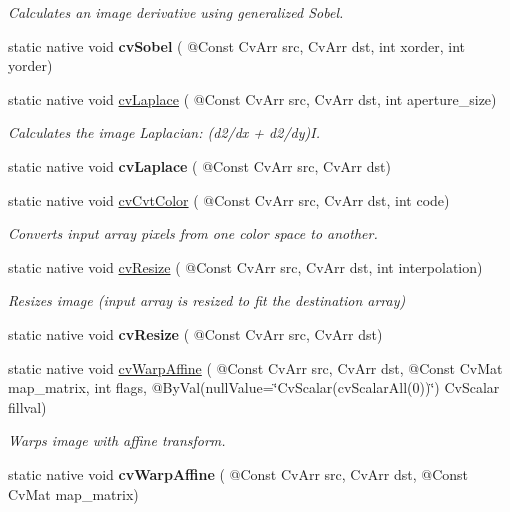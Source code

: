 \begin{DoxyCompactItemize}
\begin{DoxyCompactList}\small\item\em Calculates an image derivative using generalized Sobel. \end{DoxyCompactList}\item 
static native void {\bfseries cv\+Sobel} ( @Const Cv\+Arr src, Cv\+Arr dst, int xorder, int yorder)
\item 
static native void \hyperlink{group__imgproc__c_ga4b503d9c276d19dbced13ecd77b845a2}{cv\+Laplace} ( @Const Cv\+Arr src, Cv\+Arr dst, int aperture\+\_\+size)
\begin{DoxyCompactList}\small\item\em Calculates the image Laplacian\+: (d2/dx + d2/dy)I. \end{DoxyCompactList}\item 
static native void {\bfseries cv\+Laplace} ( @Const Cv\+Arr src, Cv\+Arr dst)
\item 
static native void \hyperlink{group__imgproc__c_gae45ba0b6ff1ccbe51ca42d2c6d6373bb}{cv\+Cvt\+Color} ( @Const Cv\+Arr src, Cv\+Arr dst, int code)
\begin{DoxyCompactList}\small\item\em Converts input array pixels from one color space to another. \end{DoxyCompactList}\item 
static native void \hyperlink{group__imgproc__c_ga45f9e0fb1d7c7f64227f5351c8e4bb2b}{cv\+Resize} ( @Const Cv\+Arr src, Cv\+Arr dst, int interpolation)
\begin{DoxyCompactList}\small\item\em Resizes image (input array is resized to fit the destination array) \end{DoxyCompactList}\item 
static native void {\bfseries cv\+Resize} ( @Const Cv\+Arr src, Cv\+Arr dst)
\item 
static native void \hyperlink{group__imgproc__c_gabf1cb9d4218222026652e60bea3c8b17}{cv\+Warp\+Affine} ( @Const Cv\+Arr src, Cv\+Arr dst, @Const Cv\+Mat map\+\_\+matrix, int flags, @By\+Val(null\+Value=\char`\"{}Cv\+Scalar(cv\+Scalar\+All(0))\char`\"{}) Cv\+Scalar fillval)
\begin{DoxyCompactList}\small\item\em Warps image with affine transform. \end{DoxyCompactList}\item 
static native void {\bfseries cv\+Warp\+Affine} ( @Const Cv\+Arr src, Cv\+Arr dst, @Const Cv\+Mat map\+\_\+matrix)

\end{DoxyCompactItemize}
